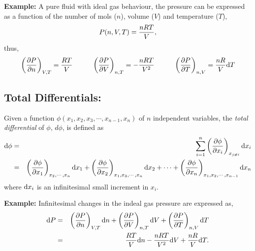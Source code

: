 {\bf Example:} A pure fluid with ideal gas behaviour, the pressure can be expressed as a function of the number of mols ($n$), volume ($V$) and temperature ($T$),
  \begin{displaymath}
     P(n,V,T) = \displaystyle\frac{n R T}{V},
  \end{displaymath}
thus,
  \begin{displaymath}
     \left(\displaystyle\frac{\partial P}{\partial n}\right)_{V,T} = \displaystyle\frac{RT}{V}\hspace{1cm} \left(\displaystyle\frac{\partial P}{\partial V}\right)_{n,T} = -\displaystyle\frac{n R T}{V^{2}} \hspace{1cm} \left(\displaystyle\frac{\partial P}{\partial T}\right)_{n,V} = \displaystyle\frac{n R}{V}\mathrm{d}{T}
  \end{displaymath}


\subsection{Total Differentials:} Given a function $\phi\left(x_{1},x_{2},x_{3},\cdots,x_{n-1},x_{n}\right)$ of $n$ independent variables, the {\it total differential} of $\phi$, $d\phi$, is defined as
  \begin{eqnarray}
     \mathrm{d}{\phi} &=& \sum\limits_{i=1}^{n}\left(\displaystyle\frac{\partial \phi}{\partial x_{i}}\right)_{x_{j\neq i}}\mathrm{d}{x_{i}} \nonumber \\
     &=& \left(\displaystyle\frac{\partial\phi}{\partial x_{1}}\right)_{x_{2},\cdots,x_{n}}\mathrm{d}{x_{1}} + \left(\displaystyle\frac{\partial\phi}{\partial x_{2}}\right)_{x_{1},x_{3},\cdots,x_{n}}\mathrm{d}{x_{2}} + \cdots +  \left(\displaystyle\frac{\partial\phi}{\partial x_{n}}\right)_{x_{1},x_{2},\cdots,x_{n-1}}\mathrm{d}{x_{n}} \nonumber 
  \end{eqnarray}
where $\mathrm{d}{x_{i}}$ is an infinitesimal small increment in $x_{i}$.

\noindent
{\bf Example:} Infinitesimal changes in the indeal gas pressure are expressed as,
  \begin{eqnarray}
     \mathrm{d}{P} &=& \left(\displaystyle\frac{\partial P}{\partial n}\right)_{V,T}\mathrm{d}{n} + \left(\displaystyle\frac{\partial P}{\partial V}\right)_{n,T}\mathrm{d}{V} + \left(\displaystyle\frac{\partial P}{\partial T}\right)_{n,V}\mathrm{d}{T} \nonumber \\
     &=& \displaystyle\frac{R T}{V}\mathrm{d}{n} - \displaystyle\frac{n R T}{V^{2}}\mathrm{d}{V} + \displaystyle\frac{n R}{V}\mathrm{d}{T}. \nonumber 
  \end{eqnarray}

